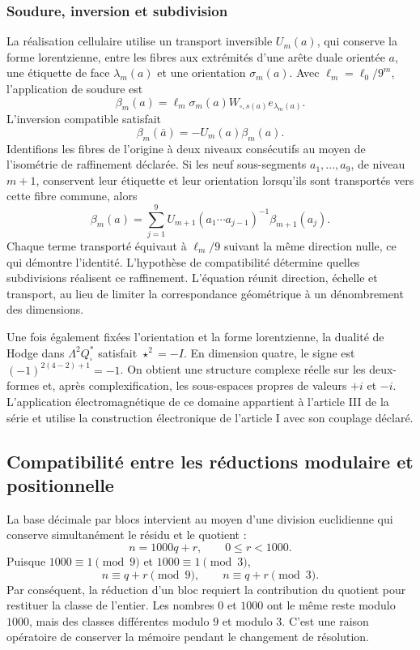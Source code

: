 \subsubsection{Soudure, inversion et subdivision}

La réalisation cellulaire utilise un transport inversible \(U_m(a)\),
qui conserve la forme lorentzienne, entre les fibres aux extrémités d'une
arête duale orientée \(a\), une étiquette
de face \(\lambda_m(a)\) et une orientation \(\sigma_m(a)\).
Avec \(\ell_m=\ell_0/9^m\), l'application de soudure est
\[
 \beta_m(a)=\ell_m\sigma_m(a)
 W_{\square,s(a)}e_{\lambda_m(a)}.
\]
L'inversion compatible satisfait
\[
 \beta_m(\bar a)=-U_m(a)\beta_m(a).
\]
Identifions les fibres de l'origine à deux niveaux consécutifs au moyen de l'isométrie de raffinement déclarée. Si les neuf sous-segments \(a_1,\ldots,a_9\), de niveau \(m+1\), conservent leur étiquette et leur orientation lorsqu'ils sont transportés vers cette fibre commune, alors
\begin{equation}
 \beta_m(a)=\sum_{j=1}^9
 U_{m+1}(a_1\cdots a_{j-1})^{-1}\beta_{m+1}(a_j).
 \label{eq:soldadura-refinamiento}
\end{equation}
Chaque terme transporté équivaut à \(\ell_m/9\) suivant la même
direction nulle, ce qui démontre l'identité. L'hypothèse de
compatibilité détermine quelles subdivisions réalisent ce raffinement.
L'équation réunit direction, échelle et transport, au lieu de limiter
la correspondance géométrique à un dénombrement des dimensions.

Une fois également fixées l’orientation et la forme lorentzienne, la dualité de
Hodge dans \(\Lambda^2Q_\square^*\) satisfait \(\star^2=-I\).
En dimension quatre, le signe est \((-1)^{2(4-2)+1}=-1\).
On obtient une structure complexe réelle sur les deux-formes et,
après complexification, les sous-espaces propres de valeurs \(+i\) et
\(-i\). L’application électromagnétique de ce domaine appartient à
l’article III de la série et utilise la construction électronique de
l’article I avec son couplage déclaré.

\subsection{Compatibilité entre les réductions modulaire et positionnelle}

La base décimale par blocs intervient au moyen d'une division euclidienne
qui conserve simultanément le résidu et le quotient :
\[
 n=1000q+r,\qquad 0\le r<1000.
\]
Puisque \(1000\equiv1\pmod9\) et \(1000\equiv1\pmod3\),
\[
 n\equiv q+r\pmod9,\qquad n\equiv q+r\pmod3.
\]
Par conséquent, la réduction d'un bloc requiert la contribution du
quotient pour restituer la classe de l'entier. Les nombres \(0\) et
\(1000\) ont le même reste modulo \(1000\), mais des classes différentes
modulo \(9\) et modulo \(3\). C'est une raison opératoire de conserver
la mémoire pendant le changement de résolution.


